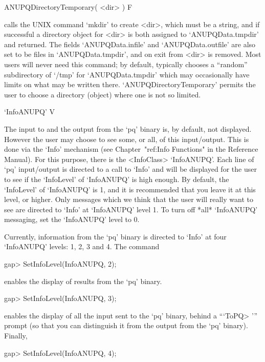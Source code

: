 \enditems

\>ANUPQDirectoryTemporary( <dir> ) F

calls the UNIX command `mkdir' to create <dir>, which must be  a  string,
and if successful a directory  object  for  <dir>  is  both  assigned  to
`ANUPQData.tmpdir'  and  returned.  The  fields  `ANUPQData.infile'   and
`ANUPQData.outfile' are also set to be files in  `ANUPQData.tmpdir',  and
on exit from {\GAP} <dir> is removed. Most users  will  never  need  this
command; by default, {\GAP} typically chooses a  ``random''  subdirectory
of `/tmp' for `ANUPQData.tmpdir' which may occasionally  have  limits  on
what may be written there. `ANUPQDirectoryTemporary' permits the user  to
choose a directory (object) where one is not so limited.


\>`InfoANUPQ' V

The input to and the output from the `pq'  binary  is,  by  default,  not
displayed. However the user may choose to  see  some,  or  all,  of  this
input/output.   This   is   done   via   the   `Info'   mechanism    (see
Chapter~"ref:Info Functions" in the {\GAP} Reference  Manual).  For  this
purpose,  there  is  the  <InfoClass>  `InfoANUPQ'.  Each  line  of  `pq'
input/output is directed to a call to `Info' and will  be  displayed  for
the user to see if the `InfoLevel' of  `InfoANUPQ'  is  high  enough.  By
default, the `InfoLevel' of `InfoANUPQ' is 1, and it is recommended  that
you leave it at this level, or higher. Only messages which we think  that
the user will really want to see are directed to  `Info'  at  `InfoANUPQ'
level 1. To turn off *all* `InfoANUPQ'  messaging,  set  the  `InfoANUPQ'
level to 0.

Currently, information from the `pq' binary is directed to `Info' at four
`InfoANUPQ' levels: 1, 2, 3 and 4. The command

\beginexample
gap> SetInfoLevel(InfoANUPQ, 2);
\endexample

enables the display of results from the `pq'  binary.

\beginexample
gap> SetInfoLevel(InfoANUPQ, 3);
\endexample

enables the display of all the input sent to the `pq'  binary,  behind  a
```ToPQ> ''' prompt (so that you can distinguish it from the output  from
the `pq' binary). Finally,

\beginexample
gap> SetInfoLevel(InfoANUPQ, 4);
\endexample

